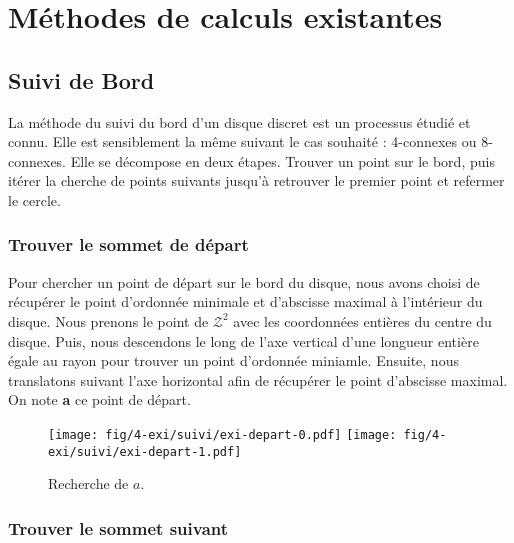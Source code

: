 \section{Méthodes de calculs existantes}

\subsection{Suivi de Bord}

La méthode du suivi du bord d'un disque discret est un processus étudié et connu. Elle est sensiblement la même suivant le cas souhaité : 4-connexes ou 8-connexes. Elle se décompose en deux étapes. Trouver un point sur le bord, puis itérer la cherche de points suivants jusqu'à retrouver le premier point et refermer le cercle.

\subsubsection{Trouver le sommet de départ}

Pour chercher un point de départ sur le bord du disque, nous avons choisi de récupérer le point d'ordonnée minimale et d'abscisse maximal à l'intérieur du disque. Nous prenons le point de $\mathcal{Z}^2$ avec les coordonnées entières du centre du disque. Puis, nous descendons le long de l'axe vertical d'une longueur entière égale au rayon pour trouver un point d'ordonnée miniamle. Ensuite, nous translatons suivant l'axe horizontal afin de récupérer le point d'abscisse maximal. On note \textbf{a} ce point de départ. 

\begin{figure}[H]
  \centering
  \texttt{[image: fig/4-exi/suivi/exi-depart-0.pdf]}
  \texttt{[image: fig/4-exi/suivi/exi-depart-1.pdf]}
  \caption{Recherche de $a$.}
\end{figure}
  

\subsubsection{Trouver le sommet suivant}

